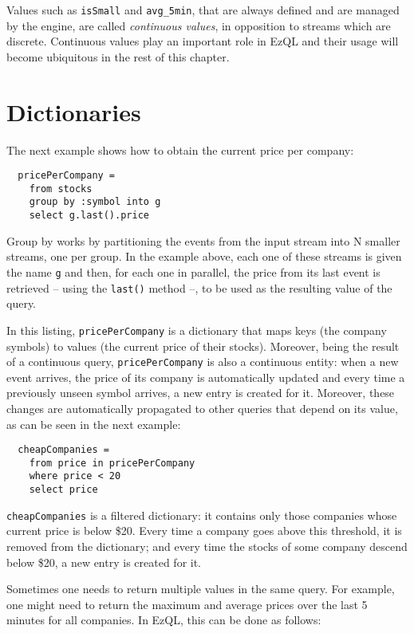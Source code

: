 \documentclass[a4,11pt]{report}
\begin{document}
Values such as \verb=isSmall= and \verb=avg_5min=, that are always
defined and are managed by the engine, are called \emph{continuous
  values}, in opposition to streams which are discrete. Continuous
values play an important role in EzQL and their usage will become
ubiquitous in the rest of this chapter.

\section{Dictionaries}

The next example shows how to obtain the current price per company:

\begin{lstlisting}
  pricePerCompany =
    from stocks
    group by :symbol into g
    select g.last().price
\end{lstlisting}

Group by works by partitioning the events from the input stream into N
smaller streams, one per group. In the example above, each one of
these streams is given the name \verb=g= and then, for each one in
parallel, the price from its last event is retrieved -- using the
\verb=last()= method --, to be used as the resulting value of the
query.

In this listing, \verb=pricePerCompany= is a dictionary that maps keys
(the company symbols) to values (the current price of their
stocks). Moreover, being the result of a continuous query,
\verb=pricePerCompany= is also a continuous entity: when a new event
arrives, the price of its company is automatically updated and every
time a previously unseen symbol arrives, a new entry is created for
it. Moreover, these changes are automatically propagated to other
queries that depend on its value, as can be seen in the next example:

\begin{lstlisting}
  cheapCompanies =
    from price in pricePerCompany
    where price < 20
    select price
\end{lstlisting}

\verb=cheapCompanies= is a filtered dictionary: it contains only those
companies whose current price is below \$20. Every time a company goes
above this threshold, it is removed from the dictionary; and every
time the stocks of some company descend below \$20, a new entry is
created for it.

Sometimes one needs to return multiple values in the same query. For
example, one might need to return the maximum and average prices over
the last 5 minutes for all companies. In EzQL, this can be done as
follows:
\end{document}
